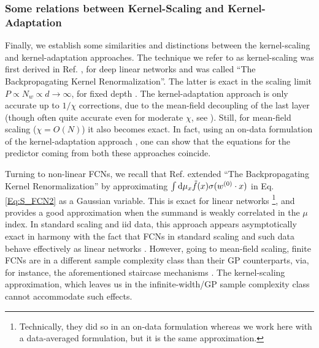 \subsubsection{Some relations between Kernel-Scaling and Kernel-Adaptation}
Finally, we establish some similarities and distinctions between the kernel-scaling and kernel-adaptation approaches. The technique we refer to as kernel-scaling was first derived in Ref. \cite{LiSompolinsky2021}, for deep linear networks and was called ``The Backpropagating Kernel Renormalization''. The latter is exact in the scaling limit $P\propto N_w \propto d \rightarrow \infty$, for fixed depth \citep{Hanin2023}. The kernel-adaptation approach is only accurate up to $1/\chi$ corrections, due to the mean-field decoupling of the last layer (though often quite accurate even for moderate $\chi$, see \cite{rubin2024a}). Still, for mean-field scaling ($\chi=O(N)$) it also becomes exact. In fact, using an on-data formulation of the kernel-adaptation approach \cite{rubin2025kernels}, one can show that the equations for the predictor coming from both these approaches coincide. 

Turning to non-linear FCNs, we recall that Ref. \cite{ariosto2022statistical} extended ``The Backpropagating Kernel Renormalization'' by approximating $\int \text{d} \mu_x \tilde{f}(x) \sigma(w^{(0)} \cdot x)$ 
in Eq. \ref{Eq:S_FCN2} as a Gaussian variable. This is exact for linear networks \footnote{Technically, they did so in an on-data formulation whereas we work here with a data-averaged formulation, but it is the same approximation.}, and provides a good approximation when the summand is weakly correlated in the $\mu$ index. In standard scaling and iid data, this approach appears asymptotically exact in harmony with the fact that FCNs in standard scaling and such data behave effectively as linear networks \citep{Cui2023}. However, going to mean-field scaling, finite FCNs are in a different sample complexity class than their GP counterparts, via, for instance, the aforementioned staircase mechanisms \citep{abbe2021staircasepropertyhierarchicalstructure,Paccolat_2021}. The kernel-scaling approximation, which leaves us in the infinite-width/GP sample complexity class cannot accommodate such effects. %

